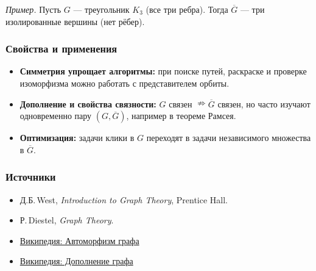\emph{Пример.} Пусть $G$ — треугольник $K_3$ (все три ребра). Тогда $\overline{G}$ — три изолированные вершины (нет рёбер).

\subsubsection{Свойства и применения}

\begin{itemize}[leftmargin=*]
  \item \textbf{Симметрия упрощает алгоритмы:} при поиске путей, раскраске и проверке изоморфизма можно работать с представителем орбиты.
  \item \textbf{Дополнение и свойства связности:} $G$ связен $\nRightarrow \overline G$ связен, но часто изучают одновременно пару $(G,\overline G)$, например в теореме Рамсея.
  \item \textbf{Оптимизация:} задачи клики в $G$ переходят в задачи независимого множества в $\overline G$.
\end{itemize}

\subsubsection{Источники}

\begin{itemize}
  \item Д.Б.\,West, \emph{Introduction to Graph Theory}, Prentice Hall.
  \item Р.\,Diestel, \emph{Graph Theory}.
  \item \href{https://ru.wikipedia.org/wiki/Автоморфизм_графа}{Википедия: Автоморфизм графа}
  \item \href{https://ru.wikipedia.org/wiki/Дополнение_графа}{Википедия: Дополнение графа}
\end{itemize}
